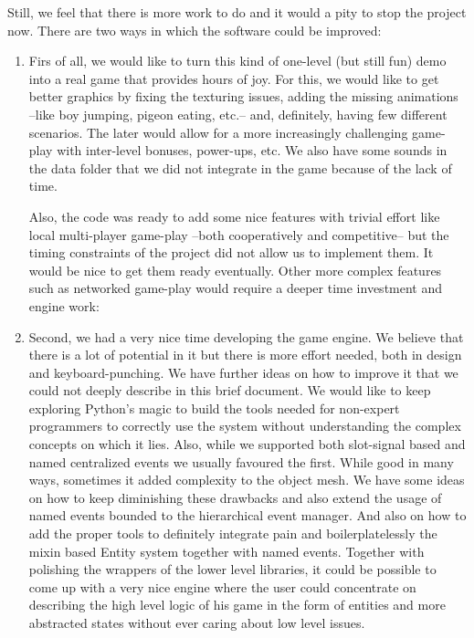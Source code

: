 \documentclass[a4paper,10pt]{article}
\begin{document}
Still, we feel that there is more work to do and it would a pity to
stop the project now. There are two ways in which the software could
be improved:
\begin{enumerate}
\item Firs of all, we would like to turn this kind of one-level (but
  still fun) demo into a real game that provides hours of joy. For
  this, we would like to get better graphics by fixing the texturing
  issues, adding the missing animations --like boy jumping, pigeon
  eating, etc.-- and, definitely, having few different scenarios. The
  later would allow for a more increasingly challenging game-play with
  inter-level bonuses, power-ups, etc. We also have some sounds in the
  data folder that we did not integrate in the game because of the
  lack of time.

  Also, the code was ready to add some nice features with trivial
  effort like local multi-player game-play --both cooperatively and
  competitive-- but the timing constraints of the project did not
  allow us to implement them. It would be nice to get them ready
  eventually. Other more complex features such as networked game-play
  would require a deeper time investment and engine work:

\item Second, we had a very nice time developing the game engine. We
  believe that there is a lot of potential in it but there is more
  effort needed, both in design and keyboard-punching. We have further
  ideas on how to improve it that we could not deeply describe in this
  brief document. We would like to keep exploring Python's magic to
  build the tools needed for non-expert programmers to correctly use
  the system without understanding the complex concepts on which it
  lies. Also, while we supported both slot-signal based and named
  centralized events we usually favoured the first. While good in many
  ways, sometimes it added complexity to the object mesh. We have some
  ideas on how to keep diminishing these drawbacks and also extend the
  usage of named events bounded to the hierarchical event manager.
  And also on how to add the proper tools to definitely
  integrate pain and boilerplatelessly the mixin based Entity
  system together with named events. Together with polishing the wrappers of
  the lower level libraries, it could be possible to come up with a
  very nice engine where the user could concentrate on describing the
  high level logic of his game in the form of entities and more
  abstracted states without ever caring about low level issues.


\end{enumerate}
\end{document}
